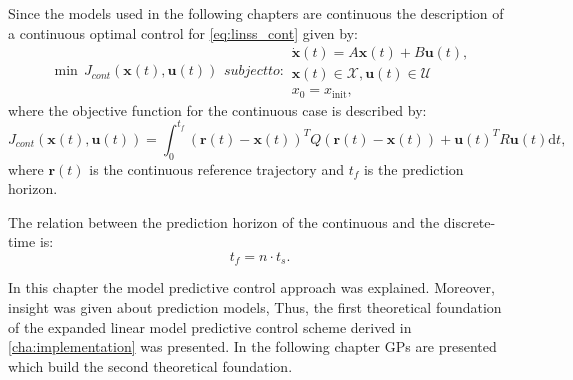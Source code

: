 Since the models used in the following chapters are continuous the description of a continuous optimal control for \eqref{eq:linss_cont} given by:
\begin{subequations} \label{eq:description_conventional_mpc_cont}
\begin{align}
\min \, J_{cont}(\mathbf{x}(t),\mathbf{u}(t)) 
\end{align}
subject to:
\begin{align}
\dot{\mathbf{x}}(t) = A\mathbf{x}(t)+B\mathbf{u}(t),\\
\mathbf{x}(t) \in \mathcal{X}, \mathbf{u}(t)  \in \mathcal{U} \\
x_0 = x_{\text{init}},
\end{align}
\end{subequations}
where the objective function for the continuous case is described by:
\begin{equation}\label{eq:quadratic_cost_cont}
J_{cont}(\mathbf{x}(t),\mathbf{u}(t)) = \int_{0}^{t_f} \! (\mathbf{r}(t)-\mathbf{x}(t))^TQ(\mathbf{r}(t)-\mathbf{x}(t))+\mathbf{u}(t)^TR\mathbf{u}(t)\mathrm{d}t,
\end{equation}
where $\mathbf{r}(t)$ is the continuous reference trajectory and ${t_f}$ is the prediction horizon.

The relation between the prediction horizon of the continuous and the discrete-time is:
\begin{equation}\label{eq:rel_cont_dis}
t_f = n \cdot t_s.
\end{equation}
\par\medskip

In this chapter the model predictive control approach was explained.
Moreover, insight was given about prediction models, 
Thus, the first theoretical foundation of the expanded linear model predictive control scheme derived in \cref{cha:implementation} was presented.
In the following chapter GPs are presented which build the second theoretical foundation.

